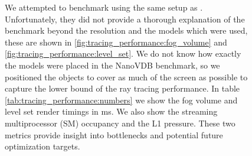 \begin{figure}[H]
    \hfill
    \vspace{0.5cm}
    \hfill
    \caption{We attempted to benchmark using the same setup as \cite{NanoVDBBenchmark}. Unfortunately, they did not provide a thorough explanation of the benchmark beyond the resolution and the models which were used, these are shown in \ref{fig:tracing_performance:fog_volume} and \ref{fig:tracing_performance:level_set}. We do not know how exactly the models were placed in the NanoVDB benchmark, so we positioned the objects to cover as much of the screen as possible to capture the lower bound of the ray tracing performance. In table \ref{tab:tracing_performance:numbers} we show the fog volume and level set render timings in ms. We also show the streaming multiprocessor (SM) occupancy and the L1 pressure. These two metrics provide insight into bottlenecks and potential future optimization targets.}
\end{figure}